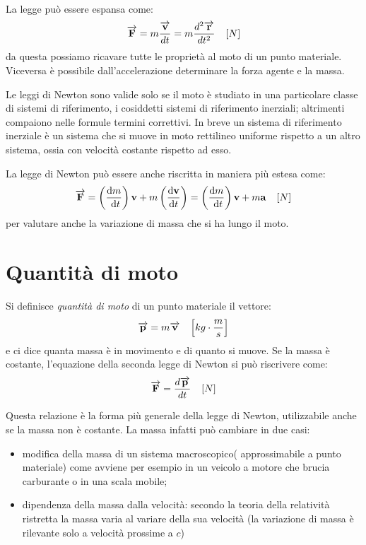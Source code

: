 \documentclass[class=book, crop=false, oneside, 12pt]{standalone}
\begin{document}
La legge può essere espansa come:
\begin{equation}
    \overrightarrow{\mathbf{F}} = m \frac{\overrightarrow{\mathbf{v}}}{dt} = m \frac{d^2 \overrightarrow{\mathbf{r}}}{dt^2} \ \udm{N}
\end{equation}
da questa possiamo ricavare tutte le proprietà al moto di un punto materiale. Viceversa è possibile dall'accelerazione determinare la forza agente e la massa.

Le leggi di Newton sono valide solo se il moto è studiato in una particolare classe di sistemi di riferimento, i cosiddetti sistemi di riferimento inerziali; altrimenti compaiono nelle formule termini correttivi.
In breve un sistema di riferimento inerziale è un sistema che si muove in moto rettilineo uniforme rispetto a un altro sistema, ossia con velocità costante rispetto ad esso.

La legge di Newton può essere anche riscritta in maniera più estesa come:
\begin{equation}
    \overrightarrow{\mathbf{F}}=\left(\frac{\mathrm{d} m}{\mathrm{~d} t}\right) \mathbf{v}+m\left(\frac{\mathrm{d} \mathbf{v}}{\mathrm{d} t}\right)=\left(\frac{\mathrm{d} m}{\mathrm{~d} t}\right) \mathbf{v}+m \mathbf{a} \ \udm{N}
\end{equation}
per valutare anche la variazione di massa che si ha lungo il moto.

\section{Quantità di moto}
Si definisce \emph{quantità di moto} di un punto materiale il vettore:
\begin{equation}
    \overrightarrow{\mathbf{p}} = m \overrightarrow{\mathbf{v}} \ \udm{kg \cdot \frac{m}{s}}
\end{equation}
e ci dice quanta massa è in movimento e di quanto si muove.
Se la massa è costante, l'equazione della seconda legge di Newton si può riscrivere come:
\begin{equation}
    \overrightarrow{\mathbf{F}} = \frac{d \overrightarrow{\mathbf{p}}}{dt} \ \udm{N}
\end{equation}

Questa relazione è la forma più generale della legge di Newton, utilizzabile anche se la massa non è costante. 
La massa infatti può cambiare in due casi:
\begin{itemize}
    \item modifica della massa di un sistema macroscopico( approssimabile a punto materiale) come avviene per esempio in un veicolo a motore che brucia carburante o in una scala mobile; 
    \item dipendenza della massa dalla velocità: secondo la teoria della relatività ristretta la massa varia al variare della sua velocità (la variazione di massa è rilevante solo a velocità prossime a \(c\))
\end{itemize}
\end{document}

